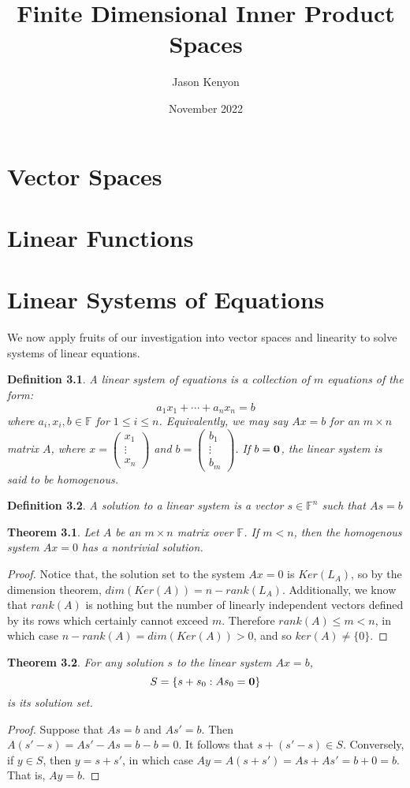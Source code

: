 \documentclass{amsbook}
\title{Finite Dimensional Inner Product Spaces}
\author{Jason Kenyon}
\date{November 2022}
\newtheorem{defn}{Definition}
\newtheorem{thm}{Theorem}
\begin{document}
\maketitle
\tableofcontents

\chapter{Vector Spaces}

\chapter{Linear Functions}
\chapter{Linear Systems of Equations}
We now apply fruits of our investigation into vector spaces and linearity to solve systems of linear equations.
\begin{defn}
  A linear system of equations is a collection of $m$ equations of the form:
  $$a_{1}x_{1}+ \cdots +a_{n}x_{n}=b$$ where $a_{i}, x_{i},b \in \mathbb{F}$ for $1 \leq i \leq n$. Equivalently, we may say
  $Ax=b$ for an $m \times n$ matrix $A$, where $x= \begin{pmatrix} x_{1} \\ \vdots \\ x_{n}\end{pmatrix}$ and $b= \begin{pmatrix} b_{1} \\ \vdots \\ b_{m}\end{pmatrix}$.
  If $b=\bold{0}$, the linear system is said to be homogenous.
\end{defn}
\begin{defn}
A solution to a linear system is a vector $s \in \mathbb{F}^{n}$ such that $As=b$
\end{defn}

\begin{thm}
Let $A$ be an $m \times n$ matrix over $\mathbb{F}$. If $m<n$, then the homogenous system $Ax=0$ has a nontrivial solution.
\end{thm}
\begin{proof}
  Notice that, the solution set to the system $Ax=0$ is $Ker(L_{A})$, so by the dimension theorem, $dim(Ker(A))=n-rank(L_{A})$. Additionally,
  we know that $rank(A)$ is nothing but the number of linearly independent vectors defined by its rows which certainly cannot exceed $m$. Therefore
  $rank(A) \leq m < n$, in which case $n-rank(A)=dim(Ker(A))>0$, and so $ker(A)\neq \{0 \}$.
\end{proof}
\begin{thm}
For any solution $s$ to the linear system $Ax=b$, $$S=\{s+s_{0}:As_{0}=\bold{0} \}$$ is its solution set.
\end{thm}
\begin{proof}
Suppose that $As=b$ and $As'=b$. Then $A(s'-s)=As'-As=b-b=0$. It follows that $s+(s'-s) \in S$. Conversely, if $y \in S$, then $y=s+s'$, in which case $Ay=A(s+s')=As+As'=b+0=b$. That is, $Ay=b$.
\end{proof}
\end{document}
